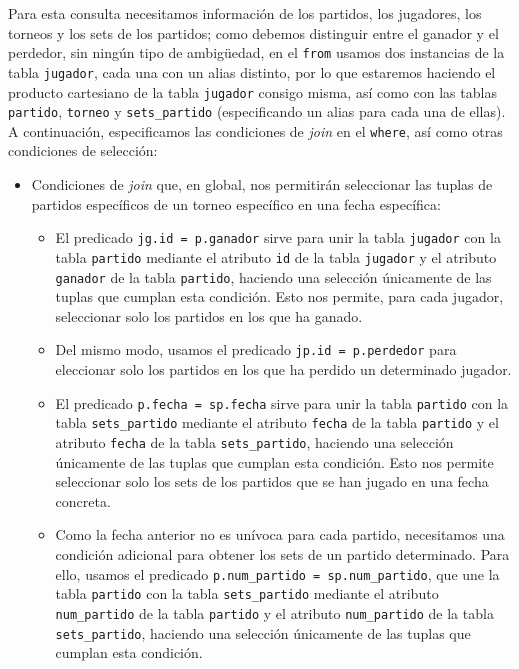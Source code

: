 Para esta consulta necesitamos información de los partidos, los jugadores, los torneos y los sets de los partidos; como debemos distinguir entre el ganador y el perdedor, sin ningún tipo de ambigüedad, en el \texttt{from} usamos dos instancias de la tabla \texttt{jugador}, cada una con un alias distinto, por lo que estaremos haciendo el producto cartesiano de la tabla \texttt{jugador} consigo misma, así como con las tablas \texttt{partido}, \texttt{torneo} y \texttt{sets\_partido} (especificando un alias para cada una de ellas). A continuación, especificamos las condiciones de \textit{join} en el \texttt{where}, así como otras condiciones de selección:
\begin{itemize}
\item Condiciones de \textit{join} que, en global, nos permitirán seleccionar las tuplas de partidos específicos de un torneo específico en una fecha específica:
\begin{itemize}
\item El predicado \texttt{jg.id = p.ganador} sirve para unir la tabla \texttt{jugador} con la tabla \texttt{partido} mediante el atributo \texttt{id} de la tabla \texttt{jugador} y el atributo \texttt{ganador} de la tabla \texttt{partido}, haciendo una selección únicamente de las tuplas que cumplan esta condición. Esto nos permite, para cada jugador, seleccionar solo los partidos en los que ha ganado.
\item Del mismo modo, usamos el predicado \texttt{jp.id = p.perdedor} para eleccionar solo los partidos en los que ha perdido un determinado jugador. 
\item El predicado \texttt{p.fecha = sp.fecha} sirve para unir la tabla \texttt{partido} con la tabla \texttt{sets\_partido} mediante el atributo \texttt{fecha} de la tabla \texttt{partido} y el atributo \texttt{fecha} de la tabla \texttt{sets\_partido}, haciendo una selección únicamente de las tuplas que cumplan esta condición. Esto nos permite seleccionar solo los sets de los partidos que se han jugado en una fecha concreta.
\item Como la fecha anterior no es unívoca para cada partido, necesitamos una condición adicional para obtener los sets de un partido determinado. Para ello, usamos el predicado \texttt{p.num\_partido = sp.num\_partido}, que une la tabla \texttt{partido} con la tabla \texttt{sets\_partido} mediante el atributo \texttt{num\_partido} de la tabla \texttt{partido} y el atributo \texttt{num\_partido} de la tabla \texttt{sets\_partido}, haciendo una selección únicamente de las tuplas que cumplan esta condición.

\end{itemize}
\end{itemize}
